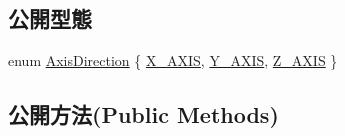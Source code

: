 \subsection*{公開型態}
\begin{DoxyCompactItemize}
\item 
enum \hyperlink{class_magnum_1_1_cone_shape3_a7c6d6ac946d54755b7e7a64217e07ea3}{Axis\+Direction} \{ \hyperlink{class_magnum_1_1_cone_shape3_a7c6d6ac946d54755b7e7a64217e07ea3a7285be4c5568c9e27fa441b57e246bb6}{X\+\_\+\+A\+X\+IS}, 
\hyperlink{class_magnum_1_1_cone_shape3_a7c6d6ac946d54755b7e7a64217e07ea3a6e3e3251bee4f380ecbaa6a42c2277a0}{Y\+\_\+\+A\+X\+IS}, 
\hyperlink{class_magnum_1_1_cone_shape3_a7c6d6ac946d54755b7e7a64217e07ea3afcbc13f75392727a208fa736b3a149ad}{Z\+\_\+\+A\+X\+IS}
 \}
\end{DoxyCompactItemize}
\subsection*{公開方法(Public Methods)}
